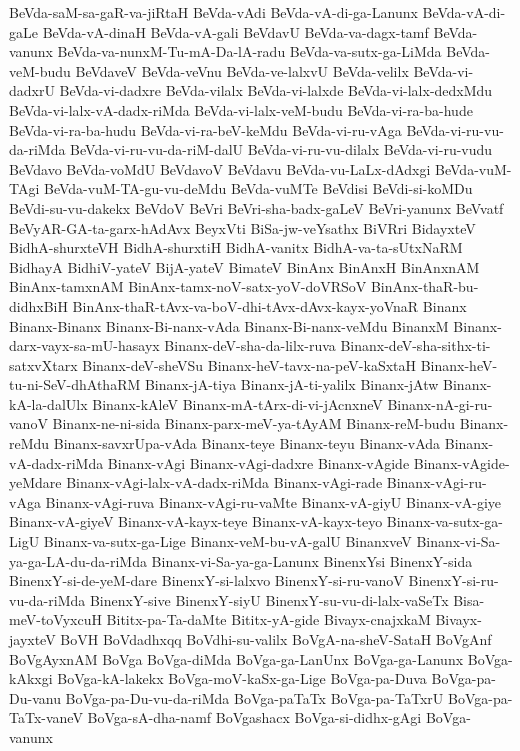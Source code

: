 {BeVda-saM-sa-gaR-va-jiRtaH
BeVda-vAdi
BeVda-vA-di-ga-Lanunx
BeVda-vA-di-gaLe
BeVda-vA-dinaH
BeVda-vA-gali
BeVdavU
BeVda-va-dagx-tamf
BeVda-vanunx
BeVda-va-nunxM-Tu-mA-Da-lA-radu
BeVda-va-sutx-ga-LiMda
BeVda-veM-budu
BeVdaveV
BeVda-veVnu
BeVda-ve-lalxvU
BeVda-velilx
BeVda-vi-dadxrU
BeVda-vi-dadxre
BeVda-vilalx
BeVda-vi-lalxde
BeVda-vi-lalx-dedxMdu
BeVda-vi-lalx-vA-dadx-riMda
BeVda-vi-lalx-veM-budu
BeVda-vi-ra-ba-hude
BeVda-vi-ra-ba-hudu
BeVda-vi-ra-beV-keMdu
BeVda-vi-ru-vAga
BeVda-vi-ru-vu-da-riMda
BeVda-vi-ru-vu-da-riM-dalU
BeVda-vi-ru-vu-dilalx
BeVda-vi-ru-vudu
BeVdavo
BeVda-voMdU
BeVdavoV
BeVdavu
BeVda-vu-LaLx-dAdxgi
BeVda-vuM-TAgi
BeVda-vuM-TA-gu-vu-deMdu
BeVda-vuMTe
BeVdisi
BeVdi-si-koMDu
BeVdi-su-vu-dakekx
BeVdoV
BeVri
BeVri-sha-badx-gaLeV
BeVri-yanunx
BeVvatf
BeVyAR-GA-ta-garx-hAdAvx
BeyxVti
BiSa-jw-veYsathx
BiVRri
BidayxteV
BidhA-shurxteVH
BidhA-shurxtiH
BidhA-vanitx
BidhA-va-ta-sUtxNaRM
BidhayA
BidhiV-yateV
BijA-yateV
BimateV
BinAnx
BinAnxH
BinAnxnAM
BinAnx-tamxnAM
BinAnx-tamx-noV-satx-yoV-doVRSoV
BinAnx-thaR-bu-didhxBiH
BinAnx-thaR-tAvx-va-boV-dhi-tAvx-dAvx-kayx-yoVnaR
Binanx
Binanx-Binanx
Binanx-Bi-nanx-vAda
Binanx-Bi-nanx-veMdu
BinanxM
Binanx-darx-vayx-sa-mU-hasayx
Binanx-deV-sha-da-lilx-ruva
Binanx-deV-sha-sithx-ti-satxvXtarx
Binanx-deV-sheVSu
Binanx-heV-tavx-na-peV-kaSxtaH
Binanx-heV-tu-ni-SeV-dhAthaRM
Binanx-jA-tiya
Binanx-jA-ti-yalilx
Binanx-jAtw
Binanx-kA-la-dalUlx
Binanx-kAleV
Binanx-mA-tArx-di-vi-jAcnxneV
Binanx-nA-gi-ru-vanoV
Binanx-ne-ni-sida
Binanx-parx-meV-ya-tAyAM
Binanx-reM-budu
Binanx-reMdu
Binanx-savxrUpa-vAda
Binanx-teye
Binanx-teyu
Binanx-vAda
Binanx-vA-dadx-riMda
Binanx-vAgi
Binanx-vAgi-dadxre
Binanx-vAgide
Binanx-vAgide-yeMdare
Binanx-vAgi-lalx-vA-dadx-riMda
Binanx-vAgi-rade
Binanx-vAgi-ru-vAga
Binanx-vAgi-ruva
Binanx-vAgi-ru-vaMte
Binanx-vA-giyU
Binanx-vA-giye
Binanx-vA-giyeV
Binanx-vA-kayx-teye
Binanx-vA-kayx-teyo
Binanx-va-sutx-ga-LigU
Binanx-va-sutx-ga-Lige
Binanx-veM-bu-vA-galU
BinanxveV
Binanx-vi-Sa-ya-ga-LA-du-da-riMda
Binanx-vi-Sa-ya-ga-Lanunx
BinenxYsi
BinenxY-sida
BinenxY-si-de-yeM-dare
BinenxY-si-lalxvo
BinenxY-si-ru-vanoV
BinenxY-si-ru-vu-da-riMda
BinenxY-sive
BinenxY-siyU
BinenxY-su-vu-di-lalx-vaSeTx
Bisa-meV-toVyxcuH
Bititx-pa-Ta-daMte
Bititx-yA-gide
Bivayx-cnajxkaM
Bivayx-jayxteV
BoVH
BoVdadhxqq
BoVdhi-su-valilx
BoVgA-na-sheV-SataH
BoVgAnf
BoVgAyxnAM
BoVga
BoVga-diMda
BoVga-ga-LanUnx
BoVga-ga-Lanunx
BoVga-kAkxgi
BoVga-kA-lakekx
BoVga-moV-kaSx-ga-Lige
BoVga-pa-Duva
BoVga-pa-Du-vanu
BoVga-pa-Du-vu-da-riMda
BoVga-paTaTx
BoVga-pa-TaTxrU
BoVga-pa-TaTx-vaneV
BoVga-sA-dha-namf
BoVgashacx
BoVga-si-didhx-gAgi
BoVga-vanunx
}
